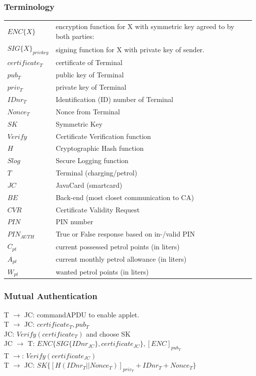 \subsubsection{Terminology}
	\begin{tabular}{*{2}{l}}
	 $ENC\{X\}$ & encryption function for X with symmetric key agreed to by both parties:\\
	 $SIG\{X\}_{privkey}$ & signing function for X with private key of sender. \\
	 $certificate_{T}$ & certificate of Terminal \\
	 $pub_{T}$ & public key of Terminal \\
 	 $priv_{T}$ & private key of Terminal  \\
	 $IDnr_{T}$ & Identification (ID) number of Terminal \\
	 $Nonce_{T}$ & Nonce from Terminal \\
	 $SK$ & Symmetric Key \\
	 $Verify$ & Certificate Verification function \\
	 $H$ & Cryptographic Hash function \\
	 $Slog$ & Secure Logging function \\
	 $T$ & Terminal (charging/petrol) \\
	 $JC$ & JavaCard (smartcard) \\
	 $BE$ & Back-end (most closet communication to CA)\\
	 $CVR$ & Certificate Validity Request \\
	 $PIN$ & PIN number \\
	 $PIN_{AUTH}$ & True or False response based on in-/valid PIN \\
	 $C_{pt}$ & current possessed petrol points (in liters) \\
	 $A_{pt}$ & current monthly petrol allowance (in liters) \\
	 $W_{pt}$ & wanted petrol points (in liters) \\

	\end{tabular}
	
\subsubsection{Mutual Authentication}
T $\to$ JC: commandAPDU to enable applet.\\
T $\to$ JC: $certificate_{T}, pub_{T}$\\
JC: $Verify(certificate_{T})$ and choose SK\\
JC $\to$ T: $ENC\{SIG\{IDnr_{JC}\}, certificate_{JC}\},  [ENC]_{pub_T}$\\
T $\to$: $Verify(certificate_{JC})$\\
T $\to$ JC: $SK\{[H(IDnr_{T}||Nonce_{T})]_{priv_T}+IDnr_{T}+Nonce_{T}\}$

